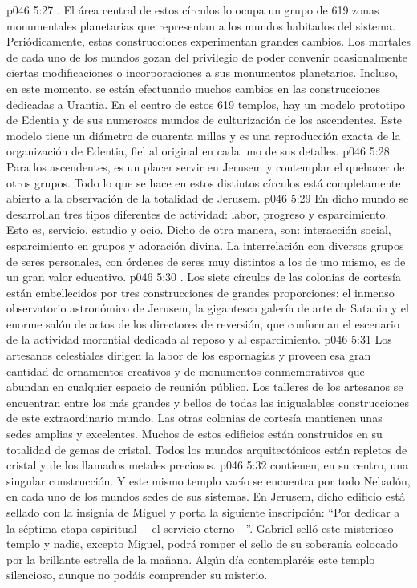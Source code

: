 \vs p046 5:27 . El área central de estos círculos lo ocupa un grupo de 619 zonas monumentales planetarias que representan a los mundos habitados del sistema. Periódicamente, estas construcciones experimentan grandes cambios. Los mortales de cada uno de los mundos gozan del privilegio de poder convenir ocasionalmente ciertas modificaciones o incorporaciones a sus monumentos planetarios. Incluso, en este momento, se están efectuando muchos cambios en las construcciones dedicadas a Urantia. En el centro de estos 619 templos, hay un modelo prototipo de Edentia y de sus numerosos mundos de culturización de los ascendentes. Este modelo tiene un diámetro de cuarenta millas y es una reproducción exacta de la organización de Edentia, fiel al original en cada uno de sus detalles.
\vs p046 5:28 Para los ascendentes, es un placer servir en Jerusem y contemplar el quehacer de otros grupos. Todo lo que se hace en estos distintos círculos está completamente abierto a la observación de la totalidad de Jerusem.
\vs p046 5:29 En dicho mundo se desarrollan tres tipos diferentes de actividad: labor, progreso y esparcimiento. Esto es, servicio, estudio y ocio. Dicho de otra manera, son: interacción social, esparcimiento en grupos y adoración divina. La interrelación con diversos grupos de seres personales, con órdenes de seres muy distintos a los de uno mismo, es de un gran valor educativo.
\vs p046 5:30 . Los siete círculos de las colonias de cortesía están embellecidos por tres construcciones de grandes proporciones: el inmenso observatorio astronómico de Jerusem, la gigantesca galería de arte de Satania y el enorme salón de actos de los directores de reversión, que conforman el escenario de la actividad morontial dedicada al reposo y al esparcimiento.
\vs p046 5:31 Los artesanos celestiales dirigen la labor de los espornagias y proveen esa gran cantidad de ornamentos creativos y de monumentos conmemorativos que abundan en cualquier espacio de reunión público. Los talleres de los artesanos se encuentran entre los más grandes y bellos de todas las inigualables construcciones de este extraordinario mundo. Las otras colonias de cortesía mantienen unas sedes amplias y excelentes. Muchos de estos edificios están construidos en su totalidad de gemas de cristal. Todos los mundos arquitectónicos están repletos de cristal y de los llamados metales preciosos.
\vs p046 5:32  contienen, en su centro, una singular construcción. Y este mismo templo vacío se encuentra por todo Nebadón, en cada uno de los mundos sedes de sus sistemas. En Jerusem, dicho edificio está sellado con la insignia de Miguel y porta la siguiente inscripción: “Por dedicar a la séptima etapa espiritual ---el servicio eterno---”. Gabriel selló este misterioso templo y nadie, excepto Miguel, podrá romper el sello de su soberanía colocado por la brillante estrella de la mañana. Algún día contemplaréis este templo silencioso, aunque no podáis comprender su misterio.
